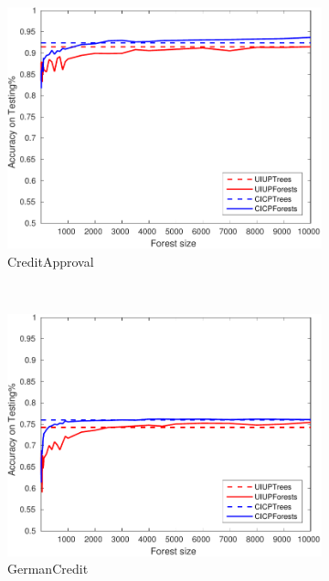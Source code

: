 \begin{figure}[ht]
  \begin{subfigure}[b]{0.3\textwidth}
		\centering
  	\includegraphics[width=\textwidth]{figs/PLPTF/Forests/CreditApprovalDownsampledFurther_Forests_MH.pdf}
  	\caption{CreditApproval}
		\label{fig:Crd4}
	\end{subfigure}
  \\
  \begin{subfigure}[b]{0.3\textwidth}
		\centering
  	\includegraphics[width=\textwidth]{figs/PLPTF/Forests/GermanCreditDownsampledFurther_Forests_MH.pdf}
  	\caption{GermanCredit}
		\label{fig:G4}
	\end{subfigure}
  \begin{subfigure}[b]{0.3\textwidth}

\end{subfigure}
\end{figure}
